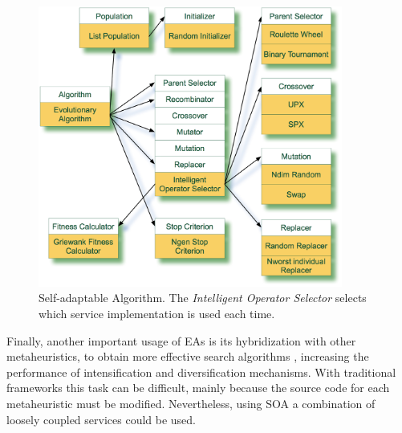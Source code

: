 \begin{figure}
\centering
\includegraphics[width=10cm]{gfx/soaea/intelligent.jpg}
\caption{Self-adaptable Algorithm. The {\em Intelligent Operator Selector} selects which service implementation is used each time.}
\label{INTELLIGENTALGORITHM}
\end{figure}


Finally, another important usage of EAs is its hybridization with other metaheuristics, to obtain more effective search algorithms \citep{HYBRID2010},  increasing the performance of intensification and diversification mechanisms. With  traditional frameworks this task can be difficult, mainly because the source code for each metaheuristic must be modified. Nevertheless, using SOA a combination of loosely coupled services could be used.


